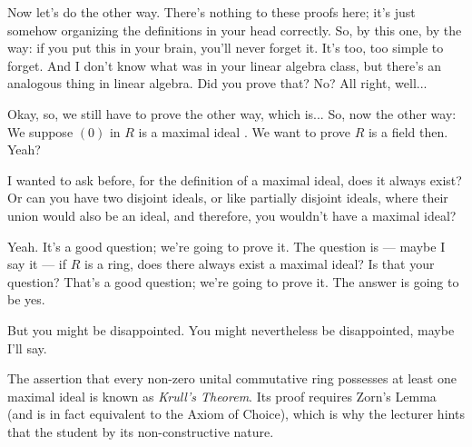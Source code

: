 \begin{speech}[00:14:48 - 00:15:30]
Now let's do the other way. There's nothing to these proofs here; it's just somehow organizing the definitions in your head correctly. So, by this one, by the way: if you put this in your brain, you'll never forget it. It's too, too simple to forget. And I don't know what was in your linear algebra class, but there's an analogous thing in linear algebra. Did you prove that? No? All right, well... 
\end{speech}

\begin{speech}[00:15:58 - 00:16:17]
Okay, so, we still have to prove the other way, which is... So, now the other way: We suppose $(0)$ in $R$ is a maximal ideal . We want to prove $R$ is a field then. Yeah?
\end{speech}

\begin{student}
I wanted to ask before, for the definition of a maximal ideal, does it always exist? Or can you have two disjoint ideals, or like partially disjoint ideals, where their union would also be an ideal, and therefore, you wouldn't have a maximal ideal?
\end{student}

\begin{speech}[00:16:30 - 00:16:51]
Yeah. It's a good question; we're going to prove it. The question is --- maybe I say it --- if $R$ is a ring, does there always exist a maximal ideal? Is that your question? That's a good question; we're going to prove it. The answer is going to be yes.

But you might be disappointed. You might nevertheless be disappointed, maybe I'll say.
\end{speech}

\begin{aiNote}
The assertion that every non-zero unital commutative ring possesses at least one maximal ideal is known as \emph{Krull's Theorem}. Its proof requires Zorn's Lemma (and is in fact equivalent to the Axiom of Choice), which is why the lecturer hints that the student  by its non-constructive nature.
\end{aiNote}

